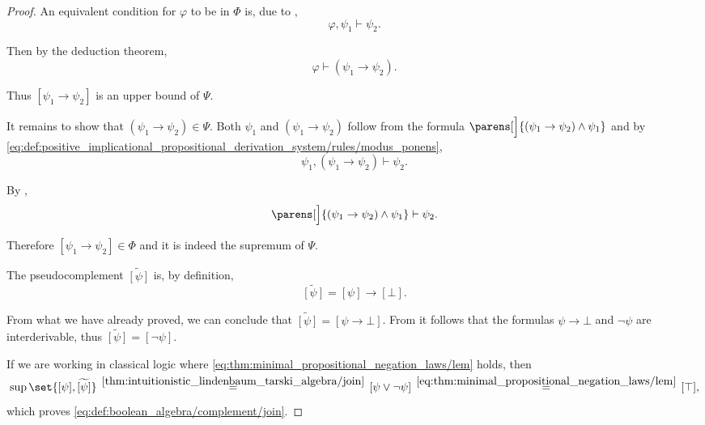 \begin{proof}
  An equivalent condition for \( \varphi \) to be in \( \Phi \) is, due to ,
  \begin{equation*}
    \varphi, \psi_1 \vdash \psi_2.
  \end{equation*}

  Then by the deduction theorem,
  \begin{equation*}
    \varphi \vdash (\psi_1 \rightarrow \psi_2).
  \end{equation*}

  Thus \( [\psi_1 \rightarrow \psi_2] \) is an upper bound of \( \Psi \).

  It remains to show that \( (\psi_1 \rightarrow \psi_2) \in \Psi \). Both \( \psi_1 \) and \( (\psi_1 \rightarrow \psi_2) \) follow from the formula \( \parens[\Big]{ (\psi_1 \rightarrow \psi_2) \wedge \psi_1 } \) and by \eqref{eq:def:positive_implicational_propositional_derivation_system/rules/modus_ponens},
  \begin{equation*}
    \psi_1, (\psi_1 \rightarrow \psi_2) \vdash \psi_2.
  \end{equation*}

  By ,
  \begin{equation*}
    \parens[\Big]{ (\psi_1 \rightarrow \psi_2) \wedge \psi_1 } \vdash \psi_2.
  \end{equation*}

  Therefore \( [\psi_1 \rightarrow \psi_2] \in \Phi \) and it is indeed the supremum of \( \Psi \).

   The pseudocomplement \( \widetilde{[\psi]} \) is, by definition,
  \begin{equation*}
    \widetilde{[\psi]}
    =
    [\psi] \rightarrow [\bot].
  \end{equation*}

  From what we have already proved, we can conclude that \( \widetilde{[\psi]} = [\psi \rightarrow \bot] \). From  it follows that the formulas \( \psi \rightarrow \bot \) and \( \neg \psi \) are interderivable, thus \( \widetilde{[\psi]} = [\neg \psi] \).

  If we are working in classical logic where \eqref{eq:thm:minimal_propositional_negation_laws/lem} holds, then
  \begin{equation*}
    \sup\set{ [\psi], \widetilde{[\psi]} }
    \reloset {\ref{thm:intuitionistic_lindenbaum_tarski_algebra/join}} =
    [\psi \vee \neg \psi]
    \reloset {\eqref{eq:thm:minimal_propositional_negation_laws/lem}} =
    [\top],
  \end{equation*}
  which proves \eqref{eq:def:boolean_algebra/complement/join}.


\end{proof}

